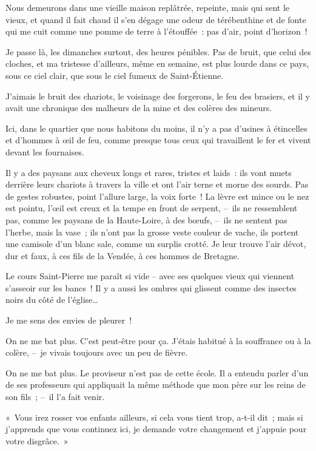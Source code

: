 \documentclass[french,twoside]{book} %
\begin{document}
\noindent Nous demeurons dans une vieille maison replâtrée, repeinte, mais qui sent le vieux, et quand il fait chaud il s’en dégage une odeur de térébenthine et de fonte qui me cuit comme une pomme de terre à l’étouffée : pas d’air, point d’horizon !\par
Je passe là, les dimanches surtout, des heures pénibles. Pas de bruit, que celui des cloches, et ma tristesse d’ailleurs, même en semaine, est plus lourde dans ce pays, sous ce ciel clair, que sous le ciel fumeux de Saint-Étienne.\par
J’aimais le bruit des chariots, le voisinage des forgerons, le feu des brasiers, et il y avait une chronique des malheurs de la mine et des colères des mineurs.\par
Ici, dans le quartier que nous habitons du moins, il n’y a pas d’usines à étincelles et d’hommes à œil de feu, comme presque tous ceux qui travaillent le fer et vivent devant les fournaises.\par
Il y a des paysans aux cheveux longs et rares, tristes et laids : ils vont muets derrière leurs chariots à travers la ville et ont l’air terne et morne des sourds. Pas de gestes robustes, point l’allure large, la voix forte ! La lèvre est mince ou le nez est pointu, l’œil est creux et la tempe en front de serpent, – ils ne ressemblent pas, comme les paysans de la Haute-Loire, à des bœufs, – ils ne sentent pas l’herbe, mais la vase ; ils n’ont pas la grosse veste couleur de vache, ils portent une camisole d’un blanc sale, comme un surplis crotté. Je leur trouve l’air dévot, dur et faux, à ces fils de la Vendée, à ces hommes de Bretagne.\par
Le cours Saint-Pierre me paraît si vide – avec ses quelques vieux qui viennent s’asseoir sur les bancs ! Il y a aussi les ombres qui glissent comme des insectes noirs du côté de l’église…\par
Je me sens des envies de pleurer !\par
\bigbreak
\noindent On ne me bat plus. C’est peut-être pour ça. J’étais habitué à la souffrance ou à la colère, – je vivais toujours avec un peu de fièvre.\par
On ne me bat plus. Le proviseur n’est pas de cette école. Il a entendu parler d’un de ses professeurs qui appliquait la même méthode que mon père sur les reins de son fils ; – il l’a fait venir.\par
« Vous irez rosser vos enfants ailleurs, si cela vous tient trop, a-t-il dit ; mais si j’apprends que vous continuez ici, je demande votre changement et j’appuie pour votre disgrâce. »\par
\end{document}
